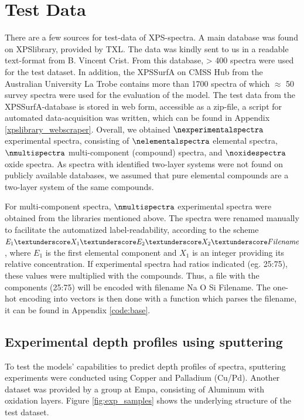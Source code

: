 
\section{Test Data}
\label{test_data}

There are a few sources for test-data of XPS-spectra. A main database was found on XPSlibrary, provided by TXL. The data was kindly sent to us in a readable text-format from B. Vincent Crist. From this database, > 400 spectra were used for the test dataset. In addition, the XPSSurfA on CMSS Hub from the Australian University La Trobe contains more than 1700 spectra of which $\approx$ 50 survey spectra were used for the evaluation of the model. The test data from the XPSSurfA-database is stored in web form, accessible as a zip-file, a script for automated data-acquisition was written, which can be found in Appendix \ref{xpslibrary_webscraper}.
Overall, we obtained $\nexperimentalspectra$ experimental spectra, consisting of $\nelementalspectra$ elemental spectra, $\nmultispectra$  multi-component (compound) spectra, and $\noxidespectra$ oxide spectra.
As spectra with identified two-layer systems were not found on publicly available databases, we assumed that pure elemental compounds are a two-layer system of the same compounds.

For multi-component spectra, $\nmultispectra$ experimental spectra were obtained from the libraries mentioned above. The spectra were renamed manually to facilitate the automatized label-readability, according to the scheme ${E_{1}\textunderscore X_{1} 	\textunderscore E_{2} 	\textunderscore X_{2} 	\textunderscore Filename}$, where $E_{1}$ is the first elemental component and $X_{1}$ is an integer providing its relative concentration. If experimental spectra had ratios indicated (eg. 25:75), these values were multiplied with the compounds. Thus, a file with the components  (25:75) will be encoded with filename Na  \textunderscore O  \textunderscore Si  \textunderscore Filename. The one-hot encoding into vectors is then done with a function which parses the filename, it can be found in Appendix \ref{code:base}.

\subsection{Experimental depth profiles using sputtering}
\label{exp_depth}
To test the models' capabilities to predict depth profiles of spectra, sputtering experiments were conducted using Copper and Palladium (Cu/Pd). Another dataset was provided by a group at Empa, consisting of Aluminum with oxidation layers. Figure \ref{fig:exp_samples} shows the underlying structure of the test dataset.

